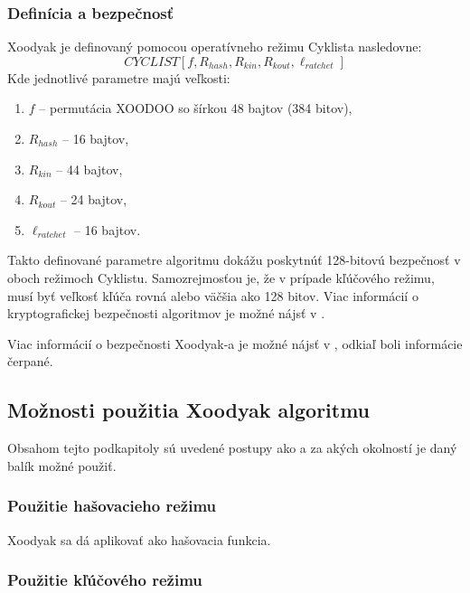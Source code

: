 \subsubsection{Definícia a bezpečnosť}
Xoodyak je definovaný pomocou operatívneho režimu Cyklista nasledovne:
\begin{equation}
	CYCLIST[f,R_{hash},R_{kin},R_{kout},\ell_{ratchet}]
\end{equation} 
Kde jednotlivé parametre majú veľkosti:
\begin{enumerate}
	\item $f$ -- permutácia XOODOO so šírkou 48 bajtov (384 bitov),
	\item $R_{hash}$ -- 16 bajtov,
	\item $R_{kin}$ -- 44 bajtov,
	\item $R_{kout}$ -- 24 bajtov,
	\item $\ell_{ratchet}$ -- 16 bajtov.  
\end{enumerate}
Takto definované parametre algoritmu dokážu poskytnúť 128-bitovú bezpečnosť v oboch režimoch Cyklistu. Samozrejmosťou je, že v prípade kľúčového režimu, musí byť veľkosť kľúča rovná alebo väčšia ako 128 bitov. Viac informácií o kryptografickej bezpečnosti algoritmov je možné nájsť v \cite{sec}.

Viac informácií o bezpečnosti Xoodyak-a je možné nájsť v \cite{xcb, 7.3}, odkiaľ boli informácie čerpané.

\subsection{Možnosti použitia Xoodyak algoritmu}
Obsahom tejto podkapitoly sú uvedené postupy ako a za akých okolností je daný balík možné použiť. 
\subsubsection{Použitie hašovacieho režimu}
Xoodyak sa dá aplikovať ako hašovacia funkcia.
\subsubsection{Použitie kľúčového režimu}

